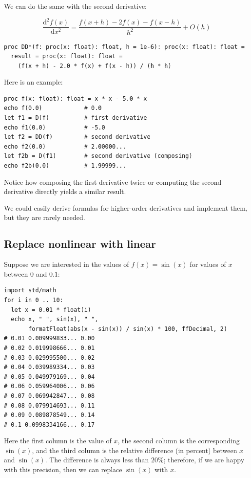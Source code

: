 \documentclass[justified, sixbynine]{tufte-book}
\def\ft{\small\tt}
\theoremstyle{plain}%
\newtheorem * {corollary}{Corollary}
\theoremstyle{definition}
\theoremstyle{remark}
\newtheorem * {remark}{Remark}
\newtheorem * {note}{Note}
\begin{document}
\begin{fullwidth}
We can do the same with the second derivative:

\begin{equation}
  \frac{\textrm{d}^2f(x)}{\textrm{d}x^2} = \frac{f(x+h)-2f(x)-f(x-h)}{h^2} + O(h)
\end{equation}

\begin{lstlisting}[caption={in file: {\ft nlib/calculus.nim}}]
proc DD*(f: proc(x: float): float, h = 1e-6): proc(x: float): float =
  result = proc(x: float): float =
    (f(x + h) - 2.0 * f(x) + f(x - h)) / (h * h)
\end{lstlisting}

Here is an example:

\begin{lstlisting}
proc f(x: float): float = x * x - 5.0 * x
echo f(0.0)            # 0.0
let f1 = D(f)          # first derivative
echo f1(0.0)           # -5.0
let f2 = DD(f)         # second derivative
echo f2(0.0)           # 2.00000...
let f2b = D(f1)        # second derivative (composing)
echo f2b(0.0)          # 1.99999...
\end{lstlisting}

Notice how composing the first derivative twice or computing the second derivative directly yields a similar result.

We could easily derive formulas for higher-order derivatives and implement them, but they are rarely needed.

\goodbreak\subsection{Replace nonlinear with linear}


Suppose we are interested in the values of $f(x)=\sin(x)$ for values of $x$ between $0$ and $0.1$:

\begin{lstlisting}
import std/math
for i in 0 .. 10:
  let x = 0.01 * float(i)
  echo x, " ", sin(x), " ",
       formatFloat(abs(x - sin(x)) / sin(x) * 100, ffDecimal, 2)
# 0.01 0.009999833... 0.00
# 0.02 0.019998666... 0.01
# 0.03 0.029995500... 0.02
# 0.04 0.039989334... 0.03
# 0.05 0.049979169... 0.04
# 0.06 0.059964006... 0.06
# 0.07 0.069942847... 0.08
# 0.08 0.079914693... 0.11
# 0.09 0.089878549... 0.14
# 0.1 0.0998334166... 0.17
\end{lstlisting}
Here the first column is the value of $x$, the second column is the corresponding $\sin(x)$, and the third column is the relative difference (in percent) between $x$ and $\sin(x)$. The difference is always less than $20\%$; therefore, if we are happy with this precision, then we can replace $\sin(x)$ with $x$.


\end{fullwidth}
\end{document}
